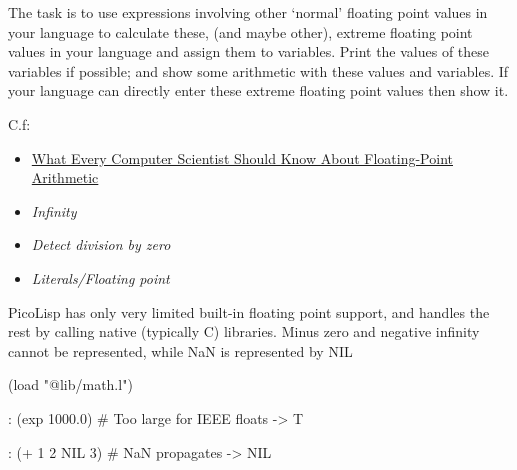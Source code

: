 The task is to use expressions involving other `normal' floating point
values in your language to calculate these, (and maybe other), extreme
floating point values in your language and assign them to variables.
Print the values of these variables if possible; and show some
arithmetic with these values and variables. If your language can
directly enter these extreme floating point values then show it.

C.f:

\begin{itemize}
\item
  \href{http://www-users.math.umd.edu/~jkolesar/mait613/floating\_point\_math.pdf}{What
  Every Computer Scientist Should Know About Floating-Point Arithmetic}
\item
  \emph{Infinity}
\item
  \emph{Detect division by zero}
\item
  \emph{Literals/Floating point}
\end{itemize}


\begin{wideverbatim}

  PicoLisp has only very limited built-in floating point support, and
  handles the rest by calling native (typically C) libraries. Minus
  zero and negative infinity cannot be represented, while NaN is
  represented by NIL

(load "@lib/math.l")

: (exp 1000.0)  # Too large for IEEE floats
-> T

: (+ 1 2 NIL 3)  # NaN propagates
-> NIL

\end{wideverbatim}



% 

